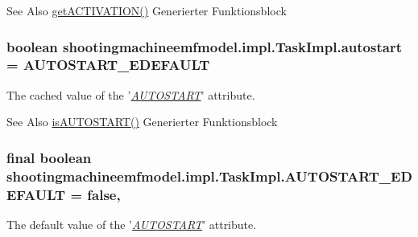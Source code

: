 \begin{DoxySeeAlso}{See Also}
\hyperlink{classshootingmachineemfmodel_1_1impl_1_1_task_impl_a7d652c92762b3e960b4fc28dacd002d0}{get\-A\-C\-T\-I\-V\-A\-T\-I\-O\-N()} Generierter Funktionsblock  
\end{DoxySeeAlso}
\hypertarget{classshootingmachineemfmodel_1_1impl_1_1_task_impl_af507c96bd2095cb7aedc71eb82918fed}{
\subsubsection[{autostart}]{\setlength{\rightskip}{0pt plus 5cm}boolean shootingmachineemfmodel.\-impl.\-Task\-Impl.\-autostart = {\bf A\-U\-T\-O\-S\-T\-A\-R\-T\-\_\-\-E\-D\-E\-F\-A\-U\-L\-T}\hspace{0.3cm}{\ttfamily [protected]}}}\label{classshootingmachineemfmodel_1_1impl_1_1_task_impl_af507c96bd2095cb7aedc71eb82918fed}
The cached value of the '\hyperlink{classshootingmachineemfmodel_1_1impl_1_1_task_impl_a21a04300417c61203bfbaa4750b93d0b}{{\itshape A\-U\-T\-O\-S\-T\-A\-R\-T}}' attribute.

\begin{DoxySeeAlso}{See Also}
\hyperlink{classshootingmachineemfmodel_1_1impl_1_1_task_impl_a21a04300417c61203bfbaa4750b93d0b}{is\-A\-U\-T\-O\-S\-T\-A\-R\-T()} Generierter Funktionsblock  
\end{DoxySeeAlso}
\hypertarget{classshootingmachineemfmodel_1_1impl_1_1_task_impl_a70eecc221cc934d53c7dd6695a9803fe}{
\subsubsection[{A\-U\-T\-O\-S\-T\-A\-R\-T\-\_\-\-E\-D\-E\-F\-A\-U\-L\-T}]{\setlength{\rightskip}{0pt plus 5cm}final boolean shootingmachineemfmodel.\-impl.\-Task\-Impl.\-A\-U\-T\-O\-S\-T\-A\-R\-T\-\_\-\-E\-D\-E\-F\-A\-U\-L\-T = false\hspace{0.3cm}{\ttfamily [static]}, {\ttfamily [protected]}}}\label{classshootingmachineemfmodel_1_1impl_1_1_task_impl_a70eecc221cc934d53c7dd6695a9803fe}
The default value of the '\hyperlink{classshootingmachineemfmodel_1_1impl_1_1_task_impl_a21a04300417c61203bfbaa4750b93d0b}{{\itshape A\-U\-T\-O\-S\-T\-A\-R\-T}}' attribute.

